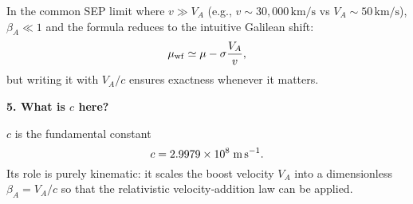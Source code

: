 \begin{tcolorbox}[colback=white, colframe=black, title={Why Does the Frame‐Change Formula Use $V_A/c$ Instead of Just $V_A$?}]
\medskip

In the common SEP limit where $v \gg V_A$ (e.g., $v \sim 30{,}000\,\text{km/s}$ vs $V_A \sim 50\,\text{km/s}$),
$\beta_A \ll 1$ and the formula reduces to the intuitive Galilean shift:
\[
\mu_{\rm wf} \simeq \mu - \sigma \frac{V_A}{v},
\]
but writing it with $V_A/c$ ensures exactness whenever it matters.

\medskip

\end{tcolorbox}
\begin{tcolorbox}[colback=white, colframe=black, title={Why Does the Frame‐Change Formula Use $V_A/c$ Instead of Just $V_A$?}]

\textbf{5. What is $c$ here?}

\medskip

$c$ is the fundamental constant 
\[
c = 2.9979 \times 10^{8}\;\text{m\,s}^{-1}.
\]
Its role is purely kinematic: it scales the boost velocity $V_A$ into a dimensionless $\beta_A = V_A/c$ so that the relativistic velocity‐addition law can be applied.

\end{tcolorbox}


